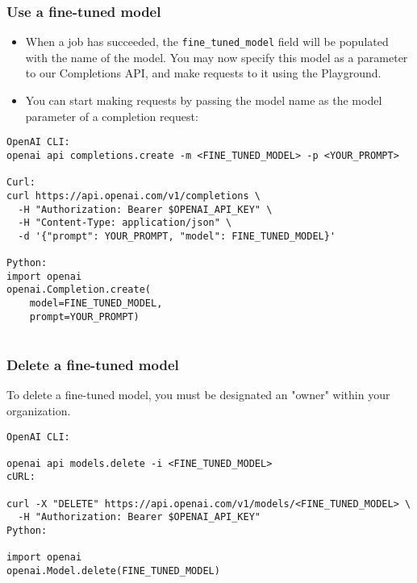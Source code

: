 \begin{frame}[fragile]\frametitle{Use a fine-tuned model}

\begin{itemize}
\item When a job has succeeded, the \lstinline|fine_tuned_model| field will be populated with the name of the model. You may now specify this model as a parameter to our Completions API, and make requests to it using the Playground.
\item You can start making requests by passing the model name as the model parameter of a completion request:
\end{itemize}	 

\begin{lstlisting}
OpenAI CLI:
openai api completions.create -m <FINE_TUNED_MODEL> -p <YOUR_PROMPT>

Curl:
curl https://api.openai.com/v1/completions \
  -H "Authorization: Bearer $OPENAI_API_KEY" \
  -H "Content-Type: application/json" \
  -d '{"prompt": YOUR_PROMPT, "model": FINE_TUNED_MODEL}'

Python:	
import openai
openai.Completion.create(
    model=FINE_TUNED_MODEL,
    prompt=YOUR_PROMPT)
		
\end{lstlisting}	
		
\end{frame}

\begin{frame}[fragile]\frametitle{Delete a fine-tuned model}

To delete a fine-tuned model, you must be designated an "owner" within your organization.

\begin{lstlisting}
OpenAI CLI:

openai api models.delete -i <FINE_TUNED_MODEL>
cURL:

curl -X "DELETE" https://api.openai.com/v1/models/<FINE_TUNED_MODEL> \
  -H "Authorization: Bearer $OPENAI_API_KEY"
Python:

import openai
openai.Model.delete(FINE_TUNED_MODEL)

\end{lstlisting}	

\end{frame}

